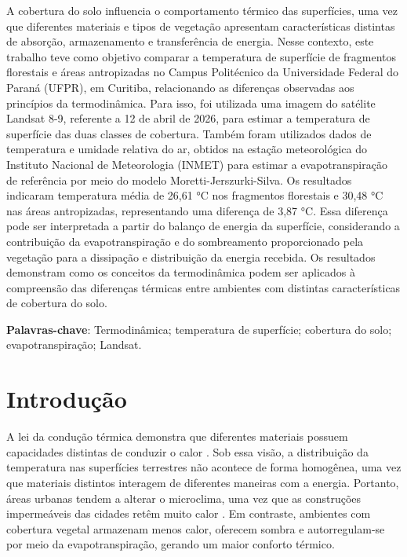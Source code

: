 \documentclass[
12pt,			%
openany,		%
oneside,		%
a4paper,		%
sumario=tradicional,
chapter=TITLE,
section=TITLE,
subsection=Title,
brazil,			%
]{abntex2}
\begin{document}
	\setlength{\absparsep}{18pt}
	\begin{resumo}
		
		A cobertura do solo influencia o comportamento térmico das superfícies, uma vez que diferentes materiais e tipos de vegetação apresentam características distintas de absorção, armazenamento e transferência de energia. Nesse contexto, este trabalho teve como objetivo comparar a temperatura de superfície de fragmentos florestais e áreas antropizadas no Campus Politécnico da Universidade Federal do Paraná (UFPR), em Curitiba, relacionando as diferenças observadas aos princípios da termodinâmica. Para isso, foi utilizada uma imagem do satélite Landsat 8-9, referente a 12 de abril de 2026, para estimar a temperatura de superfície das duas classes de cobertura. Também foram utilizados dados de temperatura e umidade relativa do ar, obtidos na estação meteorológica do Instituto Nacional de Meteorologia (INMET) para estimar a evapotranspiração de referência por meio do modelo Moretti-Jerszurki-Silva. Os resultados indicaram temperatura média de 26,61 °C nos fragmentos florestais e 30,48 °C nas áreas antropizadas, representando uma diferença de 3,87 °C. Essa diferença pode ser interpretada a partir do balanço de energia da superfície, considerando a contribuição da evapotranspiração e do sombreamento proporcionado pela vegetação para a dissipação e distribuição da energia recebida. Os resultados demonstram como os conceitos da termodinâmica podem ser aplicados à compreensão das diferenças térmicas entre ambientes com distintas características de cobertura do solo.
		
		\noindent
		\textbf{Palavras-chave}:  Termodinâmica; temperatura de superfície; cobertura do solo; evapotranspiração; Landsat.
	\end{resumo}
	
	\tableofcontents*
	\cleardoublepage
	
	\textual
	\pagestyle{simple}
	
	\chapter{Introdução}
	
	A lei da condução térmica demonstra que diferentes materiais possuem capacidades distintas de conduzir o calor \cite{halliday}. Sob essa visão, a distribuição da temperatura nas superfícies terrestres não acontece de forma homogênea, uma vez que materiais distintos interagem de diferentes maneiras com a energia. Portanto, áreas urbanas tendem a alterar o microclima, uma vez que as construções impermeáveis das cidades retêm muito calor \cite{ribeiro2016clima}. Em contraste, ambientes com cobertura vegetal armazenam menos calor, oferecem sombra e autorregulam-se por meio da evapotranspiração, gerando um maior conforto térmico. 
\end{document}

